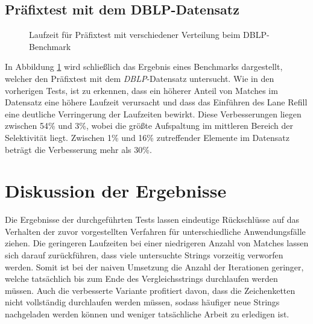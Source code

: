 \subsection{Präfixtest mit dem DBLP-Datensatz}

\begin{figure}[ht]
	\centering
	\caption{Laufzeit für Präfixtest mit verschiedener Verteilung beim DBLP-Benchmark}
\label{fig:dblp_prefix}
\end{figure}

In Abbildung \ref{fig:dblp_prefix} wird schließlich das Ergebnis eines Benchmarks dargestellt, welcher den Präfixtest mit dem \emph{DBLP}-Datensatz untersucht.
Wie in den vorherigen Tests, ist zu erkennen, dass ein höherer Anteil von Matches im Datensatz eine höhere Laufzeit verursacht und dass das Einführen des Lane Refill eine deutliche Verringerung der Laufzeiten bewirkt.
Diese Verbesserungen liegen zwischen 54\% und 3\%, wobei die größte Aufspaltung im mittleren Bereich der Selektivität liegt.
Zwischen 1\% und 16\% zutreffender Elemente im Datensatz beträgt die Verbesserung mehr als 30\%.

\section{Diskussion der Ergebnisse}

Die Ergebnisse der durchgeführten Tests lassen eindeutige Rückschlüsse auf das Verhalten der zuvor vorgestellten Verfahren für unterschiedliche Anwendungsfälle ziehen.
Die geringeren Laufzeiten bei einer niedrigeren Anzahl von Matches lassen sich darauf zurückführen, dass viele untersuchte Strings vorzeitig verworfen werden.
Somit ist bei der naiven Umsetzung die Anzahl der Iterationen geringer, welche tatsächlich bis zum Ende des Vergleichsstrings durchlaufen werden müssen.
Auch die verbesserte Variante profitiert davon, dass die Zeichenketten nicht vollständig durchlaufen werden müssen, sodass häufiger neue Strings nachgeladen werden können und weniger tatsächliche Arbeit zu erledigen ist.


